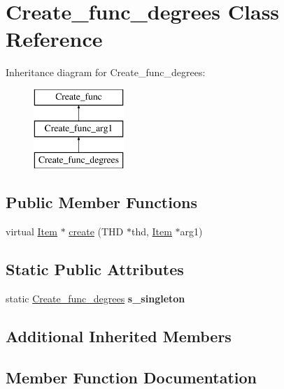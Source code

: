 \hypertarget{classCreate__func__degrees}{}\section{Create\+\_\+func\+\_\+degrees Class Reference}
\label{classCreate__func__degrees}
Inheritance diagram for Create\+\_\+func\+\_\+degrees\+:\begin{figure}[H]
\begin{center}
\leavevmode
\includegraphics[height=3.000000cm]{classCreate__func__degrees}
\end{center}
\end{figure}
\subsection*{Public Member Functions}
\begin{DoxyCompactItemize}
\item 
virtual \mbox{\hyperlink{classItem}{Item}} $\ast$ \mbox{\hyperlink{classCreate__func__degrees_afeefbcddc8760138f9c29aefab420262}{create}} (T\+HD $\ast$thd, \mbox{\hyperlink{classItem}{Item}} $\ast$arg1)
\end{DoxyCompactItemize}
\subsection*{Static Public Attributes}
\begin{DoxyCompactItemize}
\item 
\mbox{\label{classCreate__func__degrees_a7e1013d8307c90d72202f038ceb795f3}} 
static \mbox{\hyperlink{classCreate__func__degrees}{Create\+\_\+func\+\_\+degrees}} {\bfseries s\+\_\+singleton}
\end{DoxyCompactItemize}
\subsection*{Additional Inherited Members}


\subsection{Member Function Documentation}
\mbox{\label{classCreate__func__degrees_afeefbcddc8760138f9c29aefab420262}} 
